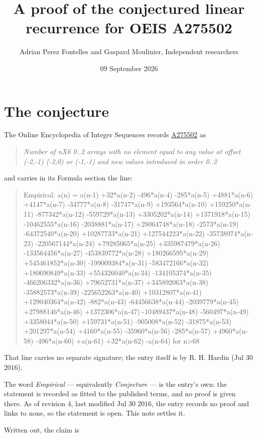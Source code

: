 \documentclass[11pt]{article}
\title{A proof of the conjectured linear recurrence for OEIS A275502}
\author{Adrian Perez Fontelles and Gaspard Moulinier, Independent researchers}
\date{09 September 2026}
\theoremstyle{definition}
\begin{document}
\maketitle
\section{The conjecture}

The Online Encyclopedia of Integer Sequences records \href{https://oeis.org/A275502}{A275502} as

\begin{quote}\itshape Number of nX6 0..2 arrays with no element equal to any value at offset (-2,-1) (-2,0) or (-1,-1) and new values introduced in order 0..2\end{quote}

and carries in its Formula section the line:

\begin{quote}\ttfamily Empirical: a(n) = a(n-1) +32*a(n-2) -496*a(n-4) -285*a(n-5) +4881*a(n-6) +4147*a(n-7) -34777*a(n-8) -31747*a(n-9) +193564*a(n-10) +159250*a(n-11) -877342*a(n-12) -559729*a(n-13) +3305202*a(n-14) +1371918*a(n-15) -10462555*a(n-16) -2038881*a(n-17) +28064748*a(n-18) -2573*a(n-19) -64372540*a(n-20) +10287733*a(n-21) +127544223*a(n-22) -35738974*a(n-23) -220567144*a(n-24) +79285065*a(n-25) +335987479*a(n-26) -133564456*a(n-27) -453839772*a(n-28) +180266595*a(n-29) +545461852*a(n-30) -199009384*a(n-31) -583472166*a(n-32) +180690849*a(n-33) +554326040*a(n-34) -134105374*a(n-35) -466206332*a(n-36) +79652731*a(n-37) +345892063*a(n-38) -35882573*a(n-39) -225652263*a(n-40) +10312807*a(n-41) +129040364*a(n-42) -882*a(n-43) -64456638*a(n-44) -2039779*a(n-45) +27988146*a(n-46) +1372306*a(n-47) -10489437*a(n-48) -560497*a(n-49) +3358044*a(n-50) +159731*a(n-51) -905008*a(n-52) -31875*a(n-53) +201297*a(n-54) +4160*a(n-55) -35960*a(n-56) -285*a(n-57) +4960*a(n-58) -496*a(n-60) +a(n-61) +32*a(n-62) -a(n-64) for n>68\end{quote}

That line carries no separate signature; the entry itself is by R. H. Hardin (Jul 30 2016).

The word {\itshape Empirical} --- equivalently {\itshape Conjecture} --- is the entry's own: the statement is recorded as fitted to the published terms, and no proof is given there. As of revision 4, last modified Jul 30 2016, the entry records no proof and links to none, so the statement is open. This note settles it.

Written out, the claim is
\end{document}

